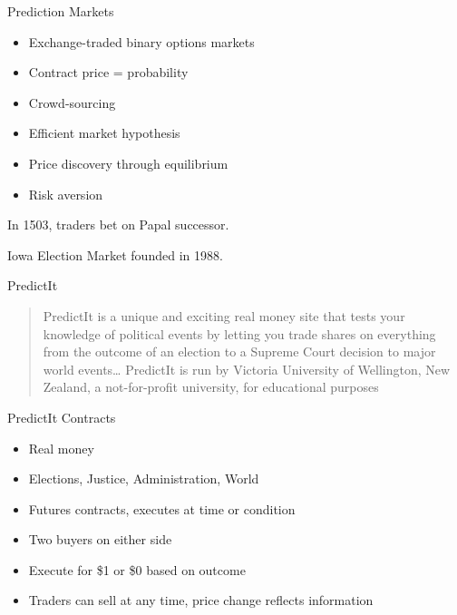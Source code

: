 \documentclass[ignorenonframetext,]{beamer}
\providecommand{\tightlist}{%
  \setlength{\itemsep}{0pt}\setlength{\parskip}{0pt}}
\begin{document}
\begin{frame}{Prediction Markets}
\protect\hypertarget{prediction-markets}{}

\begin{itemize}
\tightlist
\item
  Exchange-traded binary options markets
\item
  Contract price = probability
\item
  Crowd-sourcing
\item
  Efficient market hypothesis
\item
  Price discovery through equilibrium
\item
  Risk aversion
\end{itemize}

In 1503, traders bet on Papal successor.

Iowa Election Market founded in 1988.

\end{frame}

\begin{frame}{PredictIt}
\protect\hypertarget{predictit}{}

\begin{quote}
PredictIt is a unique and exciting real money site that tests your
knowledge of political events by letting you trade shares on everything
from the outcome of an election to a Supreme Court decision to major
world events\ldots{} PredictIt is run by Victoria University of
Wellington, New Zealand, a not-for-profit university, for educational
purposes
\end{quote}

\end{frame}

\begin{frame}{PredictIt Contracts}
\protect\hypertarget{predictit-contracts}{}

\begin{itemize}
\tightlist
\item
  Real money
\item
  Elections, Justice, Administration, World
\item
  Futures contracts, executes at time or condition
\item
  Two buyers on either side
\item
  Execute for \$1 or \$0 based on outcome
\item
  Traders can sell at any time, price change reflects information
\end{itemize}

\end{frame}
\end{document}
